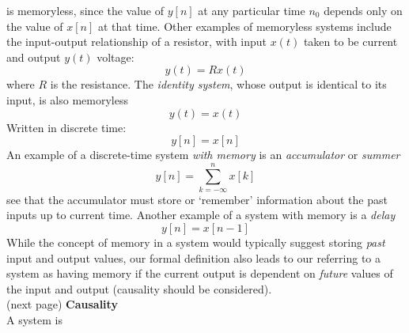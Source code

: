 \documentclass{report}
\begin{document}
is memoryless, since the value of $y[n]$ at any particular time $n_0$ depends only on the value of $x[n]$ at that time. 
Other examples of memoryless systems include the input-output relationship of a resistor, with input $x(t)$ taken to be 
current and output $y(t)$ voltage:
\begin{equation*}
y(t)=Rx(t)
\end{equation*}
where $R$ is the resistance. The \textit{identity system}, whose output is identical to its input, is also memoryless
\begin{equation*}
y(t)=x(t)
\end{equation*}
Written in discrete time:
\begin{equation*}
y[n]=x[n]
\end{equation*}
An example of a discrete-time system \textit{with memory} is an \textit{accumulator} or \textit{summer}
\begin{equation*}
y[n]=\sum^n_{k=-\infty}x[k]
\end{equation*}
see that the accumulator must store or `remember' information about the past inputs up to current time. Another example
of a system with memory is a \textit{delay}
\begin{equation*}
y[n]=x[n-1]
\end{equation*}
While the concept of memory in a system would typically suggest storing \textit{past} input and output values, our formal
definition also leads to our referring to a system as having
memory if the current output is dependent on \textit{future} values of the input and output (causality should be considered).\\
(next page)\newpage
\noindent\textbf{Causality}\\
A system is
\end{document}
